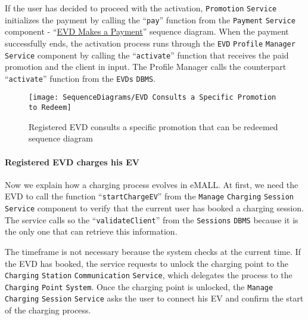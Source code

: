 If the user has decided to proceed with the activation, \verb|Promotion| \verb|Service| initializes the payment by calling the ``\verb|pay|'' function from the \verb|Payment| \verb|Service| component - ``\hyperlink{evdmakespayment}{EVD Makes a Payment}'' sequence diagram.
When the payment successfully ends, the activation process runs through the \verb|EVD| \verb|Profile| \verb|Manager| \verb|Service| component by calling the ``\verb|activate|'' function that receives the paid promotion and the client in input.
The Profile Manager calls the counterpart ``\verb|activate|'' function from the \verb|EVDs| \verb|DBMS|\@.
\begin{figure}[H]
    \begin{center}
        \texttt{[image: SequenceDiagrams/EVD Consults a Specific Promotion to Redeem]}
        \caption{Registered EVD consults a specific promotion that can be redeemed sequence diagram}
        \label{fig:evd_consults_specific_promotion_to_redeem}
    \end{center}
\end{figure}

\paragraph{Registered EVD charges his EV}
Now we explain how a charging process evolves in eMALL\@.
At first, we need the EVD to call the function ``\verb|startChargeEV|'' from the \verb|Manage| \verb|Charging| \verb|Session| \verb|Service| component to verify that the current user has booked a charging session.
The service calls so the ``\verb|validateClient|'' from the \verb|Sessions| \verb|DBMS| because it is the only one that can retrieve this information.

The timeframe is not necessary because the system checks at the current time.
If the EVD has booked, the service requests to unlock the charging point to the \verb|Charging| \verb|Station| \verb|Communication| \verb|Service|, which delegates the process to the \verb|Charging| \verb|Point| \verb|System|.
Once the charging point is unlocked, the \verb|Manage| \verb|Charging| \verb|Session| \verb|Service| asks the user to connect his EV and confirm the start of the charging process.

